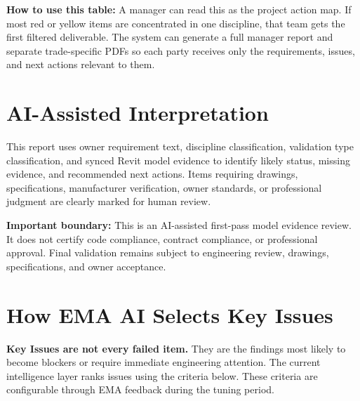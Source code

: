 \documentclass[10pt,letterpaper]{article}
\newcommand{\strong}[1]{\textbf{\textcolor{emaNavy}{#1}}}
\begin{document}
\begin{tcolorbox}[colback=emaSoft]
\strong{How to use this table:} A manager can read this as the project action map. If most red or yellow items are concentrated in one discipline, that team gets the first filtered deliverable. The system can generate a full manager report and separate trade-specific PDFs so each party receives only the requirements, issues, and next actions relevant to them.
\end{tcolorbox}

\section*{AI-Assisted Interpretation}

\begin{tcolorbox}[colback=white]
This report uses owner requirement text, discipline classification, validation type classification, and synced Revit model evidence to identify likely status, missing evidence, and recommended next actions. Items requiring drawings, specifications, manufacturer verification, owner standards, or professional judgment are clearly marked for human review.

\vspace{3pt}
\strong{Important boundary:} This is an AI-assisted first-pass model evidence review. It does not certify code compliance, contract compliance, or professional approval. Final validation remains subject to engineering review, drawings, specifications, and owner acceptance.
\end{tcolorbox}

\section*{How EMA AI Selects Key Issues}

\begin{tcolorbox}[colback=emaSoft]
\strong{Key Issues are not every failed item.} They are the findings most likely to become blockers or require immediate engineering attention. The current intelligence layer ranks issues using the criteria below. These criteria are configurable through EMA feedback during the tuning period.
\end{tcolorbox}
\end{document}
